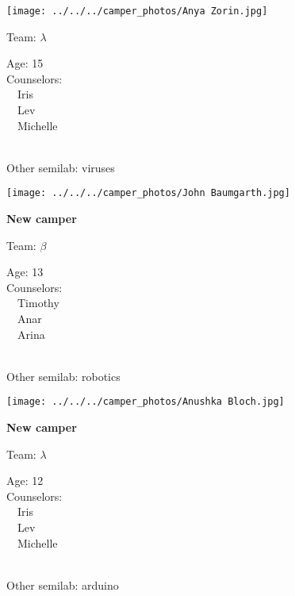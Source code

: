 \documentclass[10pt,letterpaper, landscape]{article}
\begin{document}
\verticalshiftfornextsticker
\renewcommand{\baselinestretch}{1} \begin{sticker}
\noindent\begin{minipage}{0.5\textwidth}\texttt{[image: ../../../camper\_photos/Anya Zorin.jpg]}\end{minipage}\begin{minipage}{0.45\textwidth}
Team: {\Large $\lambda$}

Age:        15\\
Counselors: \\\ \ Iris\\\ \ Lev\\\ \ Michelle\\
\end{minipage} \\ \vspace{0.07in}
Other semilab: viruses
\end{sticker}
\horizontalshiftfornextsticker
\renewcommand{\baselinestretch}{1} \begin{sticker}
\noindent\begin{minipage}{0.5\textwidth}\texttt{[image: ../../../camper\_photos/John Baumgarth.jpg]}\end{minipage}\begin{minipage}{0.45\textwidth}
\textbf{New camper} 

Team: {\Large $\beta$}

Age:        13\\
Counselors: \\\ \ Timothy\\\ \ Anar\\\ \ Arina\\
\end{minipage} \\ \vspace{0.07in}
Other semilab: robotics
\end{sticker}
\horizontalshiftfornextsticker
\renewcommand{\baselinestretch}{1} \begin{sticker}
\noindent\begin{minipage}{0.5\textwidth}\texttt{[image: ../../../camper\_photos/Anushka Bloch.jpg]}\end{minipage}\begin{minipage}{0.45\textwidth}
\textbf{New camper} 

Team: {\Large $\lambda$}

Age:        12\\
Counselors: \\\ \ Iris\\\ \ Lev\\\ \ Michelle\\
\end{minipage} \\ \vspace{0.07in}
Other semilab: arduino
\end{sticker}
\end{document}

